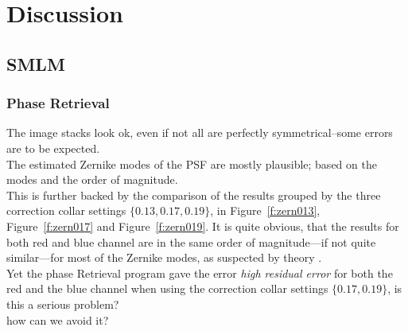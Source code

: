 \documentclass[11pt, a4paper, oneside, twocolumn]{report}
\renewcommand{\t}{\todo}
\newcommand{\e}{\emph}
\begin{document}
\twocolumn


\clearpage\chapter{Discussion}

\section{SMLM}


\subsection{Phase Retrieval}

The image stacks look ok, even if not all are perfectly
symmetrical--some errors are to be expected.\\

The estimated Zernike modes of the PSF are mostly plausible; based on
the modes and the order of magnitude.\\

This is further backed by the comparison of the results grouped by the
three correction collar settings $\{0.13,0.17,0.19\}$, in
Figure~\ref{f:zern013}, Figure~\ref{f:zern017} and
Figure~\ref{f:zern019}. It is quite obvious, that the results for both
red and blue channel are in the same order of magnitude---if not quite
similar---for most of the Zernike modes, as suspected by theory
\t{zern}.\\

Yet the phase Retrieval program gave the error \e{high residual error}
for both the red and the blue channel when using the correction collar
settings $\{0.17,0.19\}$, is this a serious problem?\\

how can we avoid it?
\end{document}
